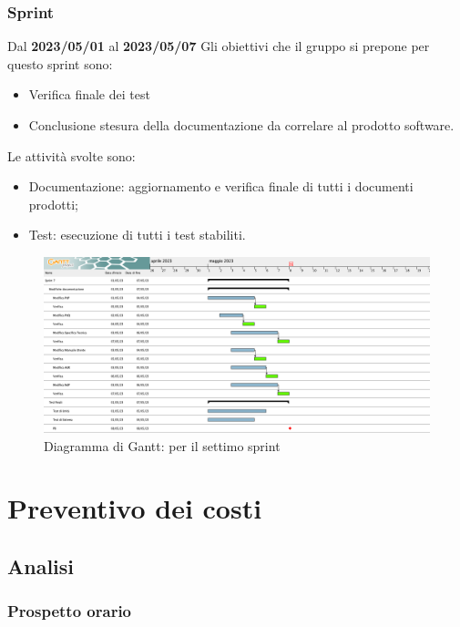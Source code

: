 \subsubsection{ Sprint}
Dal \textbf{2023/05/01} al \textbf{2023/05/07}
\newline
Gli obiettivi che il gruppo si prepone per questo sprint sono:
\begin{itemize}
    \item Verifica finale dei test
    \item Conclusione stesura della documentazione da correlare al prodotto software.
\end{itemize}
Le attività svolte sono:
\begin{itemize}
    \item Documentazione: aggiornamento e verifica finale di tutti i documenti prodotti;
    \item Test: esecuzione di tutti i test stabiliti.
\end{itemize}
\begin{figure}[H]
    \centering
    \includegraphics[scale=0.32]{src/img/Sprint 7.png}
    \caption{Diagramma di Gantt: per il settimo sprint}
\end{figure}


\section{Preventivo dei costi}
\subsection{Analisi}
\subsubsection{Prospetto orario}
\renewcommand{\arraystretch}{1.8}

